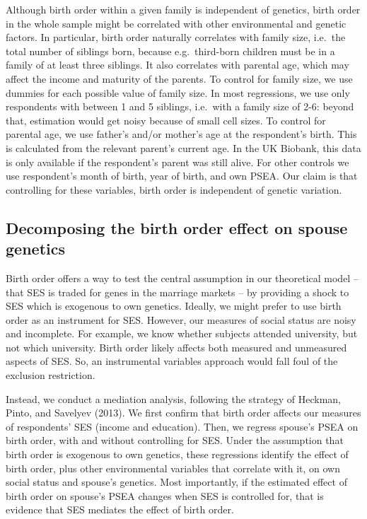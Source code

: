 \documentclass[
  12pt,
]{article}
\theoremstyle{definition}
\theoremstyle{definition}
\theoremstyle{definition}
\theoremstyle{definition}
\theoremstyle{remark}
\begin{document}
Although birth order within a given family is
independent of genetics, birth order in the whole sample might be correlated with
other environmental and genetic factors. In particular, birth order naturally
correlates with family size, i.e.~the total number of siblings born, because
e.g.~third-born children must be in a family of at least three siblings. It
also correlates with parental age, which may affect the income and
maturity of the parents. To control for family size, we use dummies for
each possible value of family size. In most regressions, we use only
respondents with between 1 and 5 siblings, i.e.~with a family size of
2-6: beyond that, estimation would get noisy because of small cell sizes.
To control for parental age, we use father's and/or mother's age at the
respondent's birth. This is calculated from the relevant
parent's current age. In the UK Biobank, this data is only available if the
respondent's parent was still alive. For other controls we use respondent's
month of birth, year of birth, and own PSEA. Our claim is that controlling
for these variables, birth order is independent of genetic variation.

\hypertarget{decomposing-the-birth-order-effect-on-spouse-genetics}{%
\subsection{Decomposing the birth order effect on spouse genetics}\label{decomposing-the-birth-order-effect-on-spouse-genetics}}

Birth order offers a way to test the central assumption in our theoretical model -- that SES is traded for genes in the marriage markets -- by providing a shock to SES
which is exogenous to own genetics. Ideally, we might prefer to use birth order
as an instrument for SES. However, our measures of social status are noisy and
incomplete. For example, we know whether subjects attended university, but not
which university. Birth order likely affects both measured and unmeasured aspects
of SES. So, an instrumental variables approach would fall foul of the exclusion
restriction.

Instead, we conduct a mediation analysis, following the strategy of
Heckman, Pinto, and Savelyev (2013). We first confirm that birth order affects our
measures of respondents' SES (income and education). Then, we regress spouse's
PSEA on birth order, with and without controlling for SES. Under the assumption
that birth order is exogenous to own genetics, these regressions identify the
effect of birth order, plus other environmental variables that correlate with
it, on own social status and spouse's genetics. Most importantly, if the
estimated effect of birth order on spouse's PSEA changes when SES is controlled
for, that is evidence that SES mediates the effect of birth order.
\end{document}
